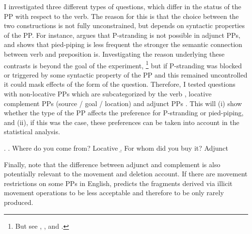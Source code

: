 \newpage
\noindent I investigated three different types of questions, which differ in the status of the PP with respect to the verb. The reason for this is that the choice between the two constructions is not fully unconstrained, but depends on syntactic properties of the PP. For instance, \citet[26]{vanriemsdijk1978} argues that P-stranding is not possible in adjunct PPs, and \citet{nykiel2017} shows that pied-piping is less frequent the stronger the semantic connection between verb and preposition is. Investigating the reason underlying these contrasts is beyond the goal of the experiment,%
% 
\footnote{But see \citet{vanriemsdijk1978}, \citet{chomsky1981}, \citet{pullum.huddleston2002} and \citet{nykiel2017}.}\afterfn%
%
but if P-stranding was blocked or triggered by some syntactic property of the PP and this remained uncontrolled it could mask effects of the form of the question. Therefore, I tested questions with non-locative PPs which are subcategorized by the verb \LLast, locative complement PPs (source / goal / location) \Next[a] and adjunct PPs \Next[b]. This will (i) show whether the type of the PP affects the preference for P-stranding or pied-piping, and (ii), if this was the case, these preferences can be taken into account in the statistical analysis.

\ex. \a. Where do you come from? \hfill Locative
     \b. For whom did you buy it? \hfill Adjunct

Finally, note that the difference between adjunct and complement is also potentially relevant to the movement and deletion account. If there are movement restrictions on some PPs in English, \citet{merchant2004} predicts the fragments derived via illicit movement operations to be less acceptable and therefore to be only rarely produced.

